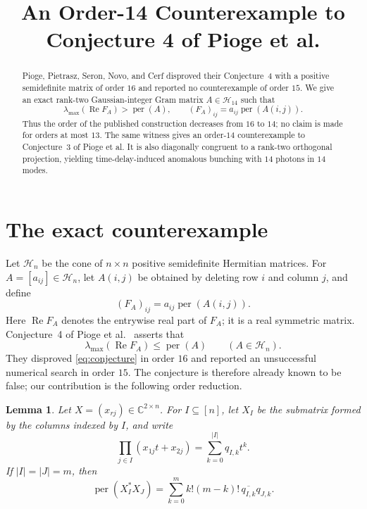 \documentclass[11pt]{amsart}
\title{An Order-14 Counterexample to Conjecture 4 of Pioge et al.}
\date{}
\newtheorem{lemma}[theorem]{Lemma}
\newcommand{\HH}{\mathcal H}
\newcommand{\permanent}{\operatorname{per}}
\newcommand{\Real}{\operatorname{Re}}
\begin{document}
\begin{abstract}
Pioge, Pietrasz, Seron, Novo, and Cerf disproved their Conjecture~4
with a positive semidefinite matrix of order $16$ and reported no
counterexample of order $15$. We give an exact rank-two
Gaussian-integer Gram matrix $A\in\HH_{14}$ such that
\[
  \lambda_{\max}(\Real F_A)>\permanent(A),
  \qquad
  (F_A)_{ij}=a_{ij}\permanent(A(i,j)).
\]
Thus the order of the published construction decreases from $16$ to
$14$; no claim is made for orders at most $13$. The same witness gives
an order-$14$ counterexample to Conjecture~3 of Pioge et al. It is also
diagonally congruent to a rank-two orthogonal projection, yielding
time-delay-induced anomalous bunching with $14$ photons in $14$ modes.
\end{abstract}

\maketitle

\section{The exact counterexample}

Let $\HH_n$ be the cone of $n\times n$ positive semidefinite Hermitian
matrices. For $A=[a_{ij}]\in\HH_n$, let $A(i,j)$ be obtained by
deleting row $i$ and column $j$, and define
\[
  (F_A)_{ij}=a_{ij}\permanent(A(i,j)).
\]
Here $\Real F_A$ denotes the entrywise real part of $F_A$; it is a real
symmetric matrix. Conjecture~4 of Pioge et al.~\cite{PiogeEtAl}
asserts that
\begin{equation}\label{eq:conjecture}
  \lambda_{\max}(\Real F_A)\leq \permanent(A)
  \qquad (A\in\HH_n).
\end{equation}
They disproved \eqref{eq:conjecture} in order $16$ and reported an
unsuccessful numerical search in order $15$. The conjecture is
therefore already known to be false; our contribution is the following
order reduction.

\begin{lemma}\label{lem:rank-two}
Let $X=(x_{rj})\in\mathbb C^{2\times n}$. For $I\subseteq[n]$, let
$X_I$ be the submatrix formed by the columns indexed by $I$, and write
\[
  \prod_{j\in I}(x_{1j}t+x_{2j})
  =\sum_{k=0}^{|I|}q_{I,k}t^k.
\]
If $|I|=|J|=m$, then
\begin{equation}\label{eq:rank-two}
  \permanent(X_I^*X_J)
  =\sum_{k=0}^{m}k!(m-k)!\,\overline{q_{I,k}}q_{J,k}.
\end{equation}
\end{lemma}
\end{document}
